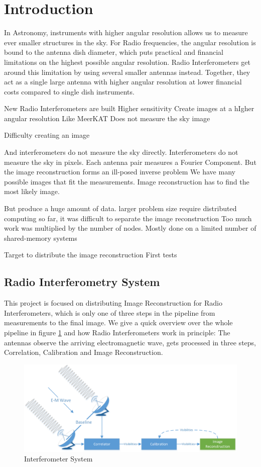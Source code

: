 \section{Introduction}
In Astronomy, instruments with higher angular resolution allows us to measure ever smaller structures in the sky. For Radio frequencies, the angular resolution is bound to the antenna dish diameter, which puts practical and financial limitations on the highest possible angular resolution. Radio Interferometers get around this limitation by using several smaller antennas instead. Together, they act as a single large antenna with higher angular resolution at lower financial costs compared to single dish instruments.

New Radio Interferometers are built
Higher sensitivity
Create images at a hIgher angular resolution
Like MeerKAT
Does not measure the sky image

Difficulty creating an image

And interferometers do not measure the sky directly. Interferometers do not measure the sky in pixels. Each antenna pair measures a Fourier Component. 
But the image reconstruction forms an ill-posed inverse problem
We have many possible images that fit the measurements.
Image reconstruction has to find the most likely image.

But produce a huge amount of data.
larger problem size require distributed computing
so far, it was difficult to separate the image reconstruction
Too much work was multiplied by the number of nodes.
Mostly done on a limited number of shared-memory systems

Target to distribute the image reconstruction
First tests


\subsection{Radio Interferometry System}
This project is focused on distributing Image Reconstruction for Radio Interferometers, which is only one of three steps in the pipeline from measurements to the final image. We give a quick overview over the whole pipeline in figure \ref{intro:system} and how Radio Interferometers work in principle: The antennas observe the arriving electromagnetic wave, gets processed in three steps, Correlation, Calibration and Image Reconstruction. 

\begin{figure}[h]
	\centering
	\includegraphics[width=0.80\linewidth]{./chapters/01.intro/system.png}
	\caption{Interferometer System}
	\label{intro:system}
\end{figure}

